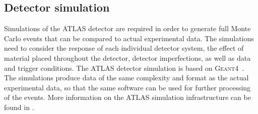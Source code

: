 

\subsection{Detector simulation}
Simulations of the ATLAS detector are required in order to generate full Monte Carlo events that can be compared to actual experimental data.
The simulations need to consider the response of each individual detector system, the effect of material placed throughout the detector, detector imperfections, as well as data and trigger conditions.
The ATLAS detector simulation is based on \textsc{Geant4}~\cite{Agostinelli:2002hh}.
The simulations produce data of the same complexity and format as the actual experimental data, so that the same software can be used for further processing of the events.
More information on the ATLAS simulation infrastructure can be found in .



